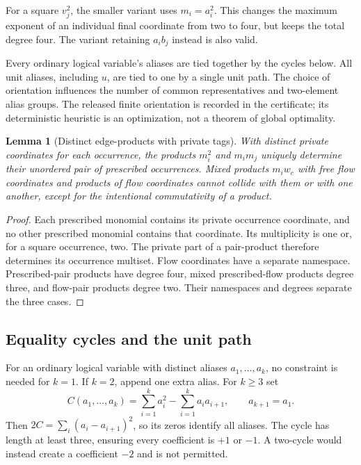 \documentclass[11pt]{article}
\newtheorem{lemma}[theorem]{Lemma}
\theoremstyle{definition}\newtheorem{definition}[theorem]{Definition}
\theoremstyle{remark}\newtheorem{remark}[theorem]{Remark}
\begin{document}
For a square $v_j^2$, the smaller variant uses $m_i=a_i^2$. This changes the
maximum exponent of an individual final coordinate from two to four, but keeps
the total degree four. The variant retaining $a_i b_j$ instead is also valid.

Every ordinary logical variable's aliases are tied together by the cycles below.
All unit aliases, including $u$, are tied to one by a single unit path.
The choice of orientation influences the number of common representatives and
two-element alias groups. The released finite orientation is recorded in the
certificate; its deterministic heuristic is an optimization, not a theorem of
global optimality.

\begin{lemma}[Distinct edge-products with private tags]\label{lem:private}
With distinct private coordinates for each occurrence, the products $m_i^2$
and $m_im_j$ uniquely determine their unordered pair of prescribed occurrences.
Mixed products $m_iw_e$ with free flow coordinates and products of flow
coordinates cannot collide with them or with one another, except for the
intentional commutativity of a product.
\end{lemma}
\begin{proof}
Each prescribed monomial contains its private occurrence coordinate, and no
other prescribed monomial contains that coordinate. Its multiplicity is one
or, for a square occurrence, two. The private part of a pair-product therefore
determines its occurrence multiset. Flow coordinates have a separate namespace.
Prescribed-pair products have degree four, mixed prescribed-flow products degree
three, and flow-pair products degree two. Their namespaces and degrees separate
the three cases.
\end{proof}



\subsection{Equality cycles and the unit path}
For an ordinary logical variable with distinct aliases $a_1,\ldots,a_k$, no
constraint is needed for $k=1$. If $k=2$, append one extra alias. For $k\ge3$ set
\[
 C(a_1,\ldots,a_k)=\sum_{i=1}^k a_i^2-
                         \sum_{i=1}^k a_ia_{i+1},\qquad a_{k+1}=a_1.
\]
Then $2C=\sum_i(a_i-a_{i+1})^2$, so its zeros identify all aliases.
The cycle has length at least three, ensuring every coefficient is $+1$ or $-1$.
A two-cycle would instead create a coefficient $-2$ and is not permitted.
\end{document}
